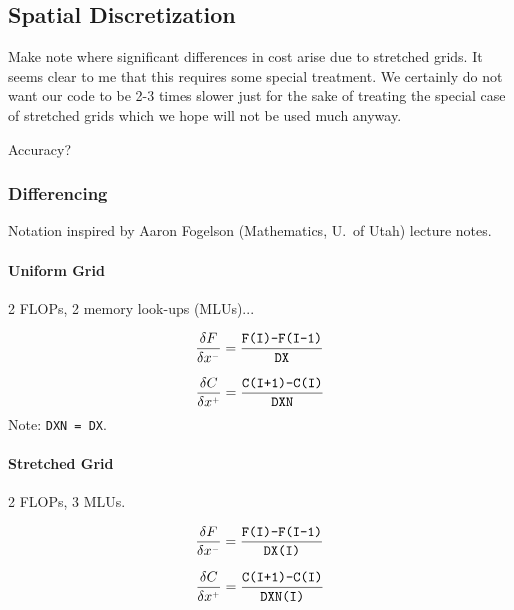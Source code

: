 \documentclass[11pt]{article}
\begin{document}
\subsection{Spatial Discretization}

Make note where significant differences in cost arise due to stretched grids.  It seems clear to me that this requires some special treatment.  We certainly do not want our code to be 2-3 times slower just for the sake of treating the special case of stretched grids which we hope will not be used much anyway.

Accuracy?

\subsubsection{Differencing}

Notation inspired by Aaron Fogelson (Mathematics, U.~of Utah) lecture notes.

\paragraph {Uniform Grid} 2 FLOPs, 2 memory look-ups (MLUs)...

\begin{equation}
\label{eqn_difference_operator_uniform_face}
\frac{\delta F}{\delta x^{\scriptscriptstyle -}} = \frac{\mbox{\tt F(I)-F(I-1)}}{\mbox{\tt DX}}
\end{equation}

\begin{equation}
\label{eqn_difference_operator_uniform_cell}
\frac{\delta C}{\delta x^{\scriptscriptstyle +}} = \frac{\mbox{\tt C(I+1)-C(I)}}{\mbox{\tt DXN}}
\end{equation}
Note: {\tt DXN = DX}.

\paragraph{Stretched Grid} 2 FLOPs, 3 MLUs.

\begin{equation}
\label{eqn_difference_operator_stretched_face}
\frac{\delta F}{\delta x^{\scriptscriptstyle -}} = \frac{\mbox{\tt F(I)-F(I-1)}}{\mbox{\tt DX(I)}}
\end{equation}

\begin{equation}
\label{eqn_difference_operator_stretched_cell}
\frac{\delta C}{\delta x^{\scriptscriptstyle +}} = \frac{\mbox{\tt C(I+1)-C(I)}}{\mbox{\tt DXN(I)}}
\end{equation}
\end{document}
